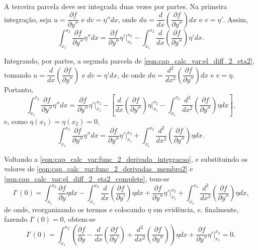 \documentclass[
	12pt,				%
	openright,			%
    twoside,			%
	a4paper,			%
	english,			%
	french,				%
	spanish,			%
	brazil				%
	]{abntex2}
\numberwithin{lema}{chapter}
\numberwithin{teorema}{chapter}
\numberwithin{definicao}{chapter}
\numberwithin{exemplo}{chapter}
\numberwithin{figure}{chapter}
\begin{document}
A terceira parcela deve ser integrada duas vezes por partes. Na primeira integração, seja $u=\dfrac{\partial f}{\partial y''}$ e $dv=\eta''dx$, onde 
$du=\dfrac{d}{dx} \left (
	\dfrac{\partial f}{\partial y''}
\right) dx$ e $v=\eta '$. Assim,
\begin{equation}
	\label{eqn:cap_calc_var:el_diff_2_eta2}
	\int_{x_1}^{x_2}
		\frac{\partial f}{\partial y''}
		\eta ''
	dx
	=
	\frac{\partial f}{\partial y''} \eta ' \Big |_{x_1}^{x_2}
	-
	\int_{x_1}^{x_2} \frac{d}{dx}
		\left ( 
			\frac{\partial f}{\partial y''}
		\right )
	\eta ' dx
	\text{.}
\end{equation}

Integrando, por partes, a segunda parcela de \eqref{eqn:cap_calc_var:el_diff_2_eta2}, tomando $u=\dfrac{d}{dx}\left (\dfrac{\partial f}{\partial y''}\right )$ e $dv=\eta'dx$, de onde $du=\dfrac{d^2}{dx^2}\left ( \dfrac{\partial f}{\partial y''} \right ) dx$ e $v=\eta$. Portanto,
$$
	\int_{x_1}^{x_2}
		\frac{\partial f}{\partial y''}
		\eta'' dx
	=
		\frac{\partial f}{\partial y''}\eta ' \Big |_{x_1}^{x_2}
		- \left [
		\frac{d}{dx} \left (
			\frac{\partial f}{\partial y''}
		\right ) \eta \Big |_{x_1}^{x_2}
		-
		\int_{x_1}^{x_2}
			\frac{d^2}{dx^2} \left (
				\frac{\partial f}{\partial y''}
			\right )
		\eta dx
	\right ]
	\text{,}
$$
e, como $\eta(x_1)=\eta(x_2)=0$,
\begin{equation}
	\label{eqn:cap_calc_var:el_diff_2_eta2_complete}
	\int_{x_1}^{x_2}
		\frac{\partial f}{\partial y''}
		\eta'' dx
	=
	\frac{\partial f}{\partial y''}\eta ' \Big |_{x_1}^{x_2}
	+
	\int_{x_1}^{x_2}
		\frac{d^2}{dx^2} \left (
			\frac{\partial f}{\partial y''}
		\right )
	\eta dx
	\text{.}
\end{equation}

Voltando a \eqref{eqn:cap_calc_var:func_2_derivada_integracao}, e substituindo os valores de \eqref{eqn:cap_calc_var:func_2_derivadas_membro2} e \eqref{eqn:cap_calc_var:el_diff_2_eta2_complete}, tem-se
$$
	I'(0)=
	\int_{x_1}^{x_2}
		\frac{\partial f}{\partial y}
		\eta dx
	-
	\int_{x_1}^{x_2}
		\frac{d}{dx}\left (
			\frac{\partial f}{\partial y'}
		\right ) \eta dx
	+
	\frac{\partial f}{\partial y''}\eta' \Big |_{x_1}^{x_2}
	+
	\int_{x_1}^{x_2}
		\frac{d^2}{dx^2}\left (
			\frac{\partial f}{\partial y''}
		\right ) \eta dx
	\text{,}
$$
de onde, reorganizando os termos e colocando $\eta$ em evidência, e, finalmente, fazendo $I'(0)=0$, obtem-se
\begin{equation}
	\label{eqn:cap_calc_var:cond_with_naturalbound}
	I'(0)=
	\int_{x_1}^{x_2}
	\left (
		\frac{\partial f}{\partial y}
	-
		\frac{d}{dx}\left (
			\frac{\partial f}{\partial y'}
		\right )
	+
		\frac{d^2}{dx^2}\left (
			\frac{\partial f}{\partial y''}
		\right )
	\right ) \eta dx
	+
	\frac{\partial f}{\partial y''}\eta' \Big |_{x_1}^{x_2}
	= 0
	\text{.}
\end{equation}
\end{document}
